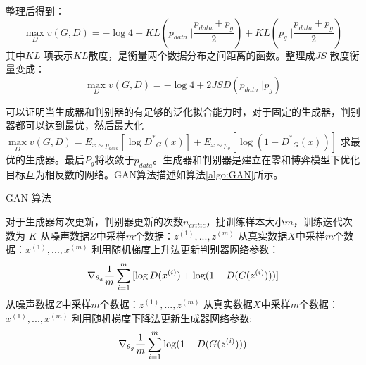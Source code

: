 整理后得到：
\begin{equation}
\label{eq:37}
\mathop {\max }\limits_D v(G,D) =  - \log 4 + KL({p_{data}}||\frac{{{p_{data}} + {p_g}}}{2}) + KL({p_g}||\frac{{{p_{data}} + {p_g}}}{2})
\end{equation}
其中$KL$ 项表示$KL$散度\cite{joyce2011kullback}，是衡量两个数据分布之间距离的函数。整理成$ JS $ 散度衡量变成：
\begin{equation}
\label{eq:38}
\mathop {\max }\limits_D v(G,D) =  - \log 4 + 2JSD({p_{data}}||{p_g})
\end{equation}

可以证明当生成器和判别器的有足够的泛化拟合能力时，对于固定的生成器，判别器都可以达到最优，然后最大化$\mathop {\max }\limits_D v(G,D) = {E_{x \sim {p_{data}}}}[\log {D^*}_G(x)] + {E_{x \sim {p_g}}}[\log (1 - {D^*}_G(x))]$ 求最优的生成器。最后$P_g$将收敛于${p_{data}}$。生成器和判别器是建立在零和博弈模型下优化目标互为相反数的网络。GAN算法描述如算法\ref{algo:GAN}所示。

\begin{algorithm}[htpb]
	\caption{GAN 算法}%
	\label{algo:GAN}
	\begin{algorithmic}[1]%
		\Require
		对于生成器每次更新，判别器更新的次数$n_{critic}$，批训练样本大小$m$，训练迭代次数为 $K$
		\State 从噪声数据$Z$中采样$m$个数据：${z^{(1)},...,z^{(m)}}$
		\State
		从真实数据$X$中采样$m$个数据：${x^{(1)},...,x^{(m)}}$ 
		\State 利用随机梯度上升法更新判别器网络参数：
		\begin{equation*}
			{\nabla _{{\theta _{\rm{d}}}}}\frac{{\rm{1}}}{m}\sum\limits_{i = 1}^m {[\log D({x^{(i)}}) + \log (1 - D(G({z^{(i)}})))]} 
		\end{equation*}
		\EndFor
		\State 从噪声数据$Z$中采样$m$个数据：${z^{(1)},...,z^{(m)}}$
		\State
		从真实数据$X$中采样$m$个数据：${x^{(1)},...,x^{(m)}}$ 
		\State 利用随机梯度下降法更新生成器网络参数:
		\begin{equation*}
		{\nabla _{{\theta _g}}}\frac{{\rm{1}}}{m}\sum\limits_{i = 1}^m {\log (1 - D(G({z^{(i)}})))}
		\end{equation*}
		\EndFor
	\end{algorithmic}
\end{algorithm}

